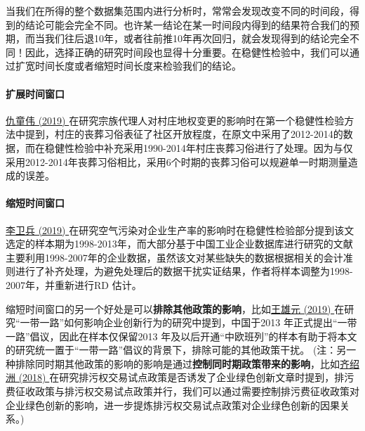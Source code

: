 \documentclass[11pt,a4paper]{ctexart}
\begin{document}
当我们在所得的整个数据集范围内进行分析时，常常会发现改变不同的时间段，得到的结论可能会完全不同。也许某一结论在某一时间段内得到的结果符合我们的预期，而当我们往后退10年，或者往前推10年再次回归，就会发现得到的结论完全不同！因此，选择正确的研究时间段也显得十分重要。在稳健性检验中，我们可以通过扩宽时间长度或者缩短时间长度来检验我们的结论。

\paragraph{扩展时间窗口}

\href{https://xueshu.baidu.com/usercenter/paper/show?paperid=1b5j0cj0990306t0f32h04d0t5775793&site=xueshu_se&hitarticle=1}{仇童伟
(2019)
}在研究宗族代理人对村庄地权变更的影响时在第一个稳健性检验方法中提到，村庄的丧葬习俗表征了社区开放程度，在原文中采用了2012-2014的数据，而在稳健性检验中补充采用1990-2014年村庄丧葬习俗进行了处理。因为与仅采用2012-2014年丧葬习俗相比，采用6个时期的丧葬习俗可以规避单一时期测量造成的误差。

\paragraph{缩短时间窗口}

\href{https://xueshu.baidu.com/usercenter/paper/show?paperid=1a770p60a52b0ec0225k0ew0mx070151&site=xueshu_se}{李卫兵
(2019)
}在研究空气污染对企业生产率的影响时在稳健性检验部分提到该文选定的样本期为1998-2013年，而大部分基于中国工业企业数据库进行研究的文献主要利用1998-2007年的企业数据，虽然该文对某些缺失的数据根据相关的会计准则进行了补齐处理，为避免处理后的数据干扰实证结果，作者将样本调整为1998-2007年，并重新进行RD
估计。

缩短时间窗口的另一个好处是可以\textbf{排除其他政策的影响}，比如\href{https://xueshu.baidu.com/usercenter/paper/show?paperid=1d380vh0gr5x0080aj3c0tf0h6028132&site=xueshu_se}{王雄元
(2019) }在研究``一带一路''如何影响企业创新行为的研究中提到，中国于2013
年正式提出``一带一路''倡议，因此在样本仅保留2013
年及以后开通``中欧班列''的样本有助于将本文的研究统一置于``一带一路''倡议的背景下，排除可能的其他政策干扰。
(注：另一种排除同时期其他政策的影响的影响是通过\textbf{控制同时期政策带来的影响}，比如\href{https://xueshu.baidu.com/usercenter/paper/show?paperid=107b0j60rm030eg0g53s0mj0jj445931&site=xueshu_se}{齐绍洲
(2018)
}在研究排污权交易试点政策是否诱发了企业绿色创新文章时提到，排污费征收政策与排污权交易试点政策并行，我们可以通过需要控制排污费征收政策对企业绿色创新的影响，进一步提炼排污权交易试点政策对企业绿色创新的因果关系。)
\end{document}
